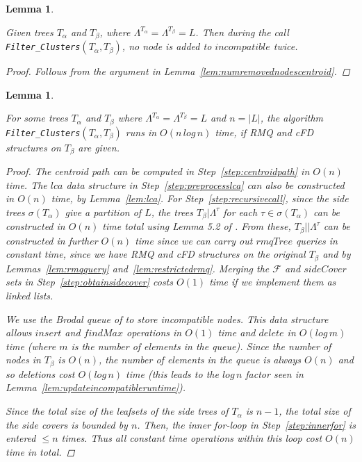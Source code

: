 \documentclass[12pt,a4paper]{article}
\newcommand{\leafset}{\Lambda}
\newcommand{\TA}{T_\alpha}
\newcommand{\TB}{T_\beta}
\newtheorem{numaddednodes}[incompatibility]{Lemma}
\newtheorem{filterclustersruntime}[incompatibility]{Lemma}
\begin{document}
    \begin{numaddednodes}
        \label{lem:numaddednodes}

        Given trees $\TA$ and $\TB$, where $\leafset^{\TA} = \leafset^{\TB} = L$. Then during the call \texttt{Filter\_Clusters}$(\TA, \TB)$, no node is added to $incompatible$ twice.

        \begin{proof}
            Follows from the argument in Lemma~\ref{lem:numremovednodescentroid}.
        \end{proof}
    \end{numaddednodes}

    \medskip
    \begin{filterclustersruntime}
        \label{lem:filterclustersruntime}

        For some trees $\TA$ and $\TB$ where $\leafset^{\TA} = \leafset^{\TB} = L$ and $n = |L|$, the algorithm \texttt{Filter\_Clusters}$(\TA, \TB)$ runs in $O(n\,log\,n)$ time, if RMQ and cFD structures on $\TB$ are given.

        \begin{proof}
            The centroid path can be computed in Step~\ref{step:centroidpath} in $O(n)$ time.  The $lca$ data structure in Step~\ref{step:preprocesslca} can also be constructed in $O(n)$ time, by Lemma~\ref{lem:lca}. For Step~\ref{step:recursivecall}, since the side trees $\sigma(\TA)$ give a partition of $L$, the trees $\TB|\leafset^{\tau}$ for each $\tau \in \sigma(\TA)$ can be constructed in $O(n)$ time total using Lemma 5.2 of \cite{farach1995fast}. From these, $\TB||\leafset^{\tau}$ can be constructed in further $O(n)$ time since we can carry out $rmqTree$ queries in constant time, since we have RMQ and cFD structures on the original $\TB$ and by Lemmas~\ref{lem:rmqquery} and~\ref{lem:restrictedrmq}. Merging the $\mathcal{F}$ and $sideCover$ sets in Step~\ref{step:obtainsidecover} costs $O(1)$ time if we implement them as linked lists.

            We use the Brodal queue of \cite{brodal1995fast} to store incompatible nodes. This data structure allows $insert$ and $findMax$ operations in $O(1)$ time and $delete$ in $O(log\,m)$ time (where $m$ is the number of elements in the queue). Since the number of nodes in $\TB$ is $O(n)$, the number of elements in the queue is always $O(n)$ and so deletions cost $O(log\,n)$ time (this leads to the $log\,n$ factor seen in Lemma~\ref{lem:updateincompatibleruntime}).

            Since the total size of the leafsets of the side trees of $\TA$ is $n - 1$, the total size of the side covers is bounded by $n$. Then, the inner for-loop in Step~\ref{step:innerfor} is entered $\leq n$ times. Thus all constant time operations within this loop cost $O(n)$ time in total.


\end{proof}
\end{filterclustersruntime}
\end{document}

